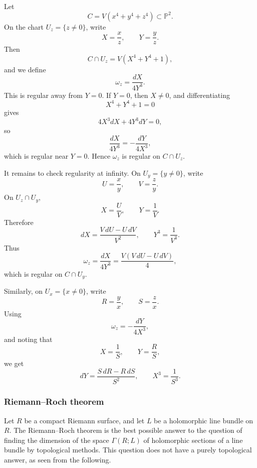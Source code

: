 \documentclass[12pt]{article}
\begin{document}
\begin{solution}
    Let
    \[
        C=V(x^4+y^4+z^4)\subset \mathbb P^2.
    \]
    On the chart \(U_z=\{z\neq 0\}\), write
    \[
        X=\frac{x}{z},\qquad Y=\frac{y}{z}.
    \]
    Then
    \[
        C\cap U_z=V(X^4+Y^4+1),
    \]
    and we define
    \[
        \omega_z=\frac{dX}{4Y^3}.
    \]
    This is regular away from \(Y=0\). If \(Y=0\), then \(X\neq 0\), and differentiating
    \[
        X^4+Y^4+1=0
    \]
    gives
    \[
        4X^3dX+4Y^3dY=0,
    \]
    so
    \[
        \frac{dX}{4Y^3}=-\frac{dY}{4X^3},
    \]
    which is regular near \(Y=0\). Hence \(\omega_z\) is regular on \(C\cap U_z\).

    It remains to check regularity at infinity. On \(U_y=\{y\neq 0\}\), write
    \[
        U=\frac{x}{y},\qquad V=\frac{z}{y}.
    \]
    On \(U_z\cap U_y\),
    \[
        X=\frac{U}{V},\qquad Y=\frac{1}{V}.
    \]
    Therefore
    \[
        dX=\frac{V\,dU-U\,dV}{V^2},
        \qquad
        Y^3=\frac{1}{V^3}.
    \]
    Thus
    \[
        \omega_z
        =
        \frac{dX}{4Y^3}
        =
        \frac{V(V\,dU-U\,dV)}{4},
    \]
    which is regular on \(C\cap U_y\).

    Similarly, on \(U_x=\{x\neq 0\}\), write
    \[
        R=\frac{y}{x},\qquad S=\frac{z}{x}.
    \]
    Using
    \[
        \omega_z=-\frac{dY}{4X^3},
    \]
    and noting that
    \[
        X=\frac{1}{S},\qquad Y=\frac{R}{S},
    \]
    we get
    \[
        dY=\frac{S\,dR-R\,dS}{S^2},
        \qquad
        X^3=\frac{1}{S^3}.
    \]
\end{solution}

\subsubsection{Riemann--Roch theorem} Let $R$ be a compact Riemann surface, and let $L$ be a holomorphic line bundle on $R$. The Riemann--Roch theorem is the best possible answer to the question of
finding the dimension of the space $\Gamma(R;L)$ of holomorphic sections of a
line bundle by topological methods. This question does not have a purely
topological answer, as seen from the following.
\end{document}
